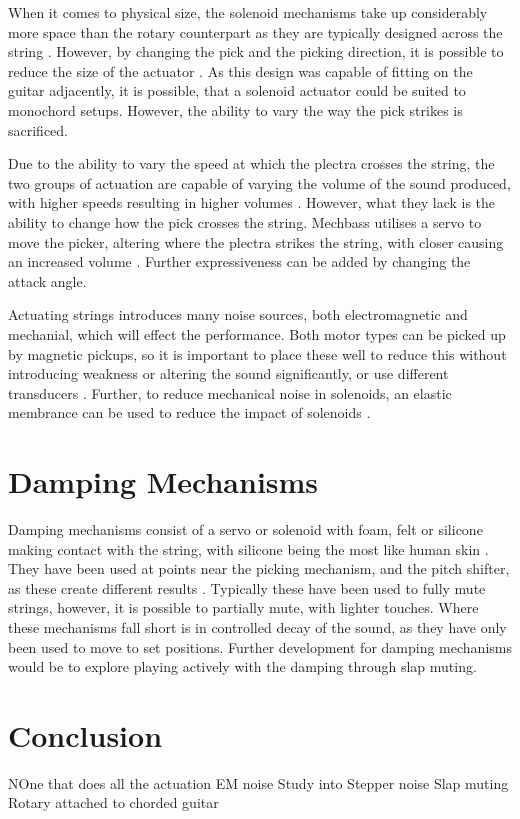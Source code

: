 \documentclass[12pt, a4paper, onecolumn]{IEEEtran}
\begin{document}
        When it comes to physical size, the solenoid mechanisms take up considerably more space than the rotary counterpart as they are typically designed across the string \cite{VUW_Chordophones,Silent_Picking,PWM_Solenoid}.
        However, by changing the pick and the picking direction, it is possible to reduce the size of the actuator \cite{Pivot_Picking}.
        As this design was capable of fitting on the guitar adjacently, it is possible, that a solenoid actuator could be suited to monochord setups.
        However, the ability to vary the way the pick strikes is sacrificed.

        Due to the ability to vary the speed at which the plectra crosses the string, the two groups of actuation are capable of varying the volume of the sound produced, with higher speeds resulting in higher volumes \cite{PWM_Solenoid}.
        However, what they lack is the ability to change how the pick crosses the string.
        Mechbass utilises a servo to move the picker, altering where the plectra strikes the string, with closer causing an increased volume \cite{VUW_Chordophones}. 
        Further expressiveness can be added by changing the attack angle. 

        Actuating strings introduces many noise sources, both electromagnetic and mechanial, which will effect the performance.
        Both motor types can be picked up by magnetic pickups, so it is important to place these well to reduce this without introducing weakness or altering the sound significantly, or use different transducers \cite{VUW_Chordophones}.
        Further, to reduce mechanical noise in solenoids, an elastic membrance can be used to reduce the impact of solenoids \cite{Silent_Picking}.

        
    \section{Damping Mechanisms}
        Damping mechanisms consist of a servo or solenoid with foam, felt or silicone making contact with the string, with silicone being the most like human skin \cite{VUW_Chordophones}.
        They have been used at points near the picking mechanism, and the pitch shifter, as these create different results \cite{VUW_Chordophones}.
        Typically these have been used to fully mute strings, however, it is possible to partially mute, with lighter touches.
        Where these mechanisms fall short is in controlled decay of the sound, as they have only been used to move to set positions.
        Further development for damping mechanisms would be to explore playing actively with the damping through slap muting.


    \section{Conclusion}
        NOne that does all the actuation
        EM noise
        Study into Stepper noise
        Slap muting
        Rotary attached to chorded guitar

    \printbibliography
\end{document}
